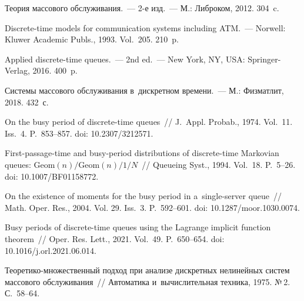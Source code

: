 \begin{multicols}{2}
\vspace*{-8pt}

{\small\frenchspacing
 {\baselineskip=10.8pt
 
 \vspace*{-6pt}
 
 \begin{thebibliography}{99}   
     Теория массового
    обслуживания.~--- 2-е изд.~--- М.:
    Либроком, 2012. 304~c.
    
     Discrete-time models for communication systems
    including ATM.~--- Norwell: Kluwer Academic Publs.,
    1993.  Vol.~205. 210~p.
    
     Applied discrete-time queues.~--- 2nd ed.~--- New York,
    NY, USA: Springer-Verlag, 2016. 400~p.
    
     Системы массового обслуживания в~дискретном времени.~--- М.: Физматлит, 2018. 432~с.
    
  
    
    On the busy period of discrete-time
    queues~// J.~Appl. Probab., 1974. Vol.~11. Iss.~4. P.~853--857. doi: 10.2307/3212571.
    
 First-passage-time and busy-period
    distributions of discrete-time Markovian queues: $\mathrm{Geom}(n)/\mathrm{Geom}(n)/1/N$~//
    Queueing Syst., 1994. Vol.~18. P.~5--26. doi: 10.1007/BF01158772.
    
 On the existence of moments for the busy
    period in a~single-server queue~// Math. Oper.
    Res., 2004. Vol. 29. Iss.~3. P.~592--601. doi: 10.1287/moor.1030.0074.
    
 Busy periods of discrete-time queues using the Lagrange
    implicit function theorem~// Oper. Res.
    Lett., 2021. Vol.~49. P.~650--654.  doi: 10.1016/j.orl.2021.06.014.
    
 Тео\-ре\-ти\-ко-мно\-жест\-вен\-ный подход при анализе
    дискретных нелинейных систем массового обслуживания~// Автоматика 
    и~вычислительная техника, 1975. №\,2.  С.~58--64.
    

\end{thebibliography}}}
\end{multicols}
